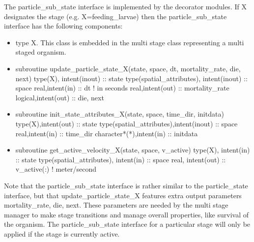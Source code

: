 The particle\_sub\_state interface is implemented by the decorator modules.
If X designates the stage (e.g. X=feeding\_larvae) then the particle\_sub\_state interface has the following 
components:
\begin{itemize}
  \item type X. This class is embedded in the multi stage class representing a multi staged organism.

 \item subroutine update\_particle\_state\_X(state, space, dt, mortality\_rate, die, next)  \newline
type(X), intent(inout)     :: state  \newline
type(spatial\_attributes), intent(inout) :: space  \newline
real,intent(in)                         :: dt ! in seconds  \newline
real,intent(out)                        :: mortality\_rate  \newline
logical,intent(out)                     :: die, next  \newline


 \item subroutine init\_state\_attributes\_X(state, space, time\_dir,  initdata)  \newline
type(X),intent(out)       :: state  \newline
type(spatial\_attributes),intent(inout) :: space  \newline
real,intent(in)                        :: time\_dir   \newline           
character*(*),intent(in)               :: initdata  \newline


 \item subroutine get\_active\_velocity\_X(state, space, v\_active)  \newline
type(X), intent(in)     :: state  \newline
type(spatial\_attributes), intent(in) :: space  \newline      
real, intent(out)                    :: v\_active(:) ! meter/second  \newline


\end{itemize}

Note that the particle\_sub\_state interface is rather similar to the particle\_state interface, but that
update\_particle\_state\_X features extra output parameters mortality\_rate, die, next. These
parameters are needed by the multi stage manager to make stage transitions and manage overall
properties, like survival of the organism. The particle\_sub\_state interface for a particular stage will only
be applied if the stage is currently active.


